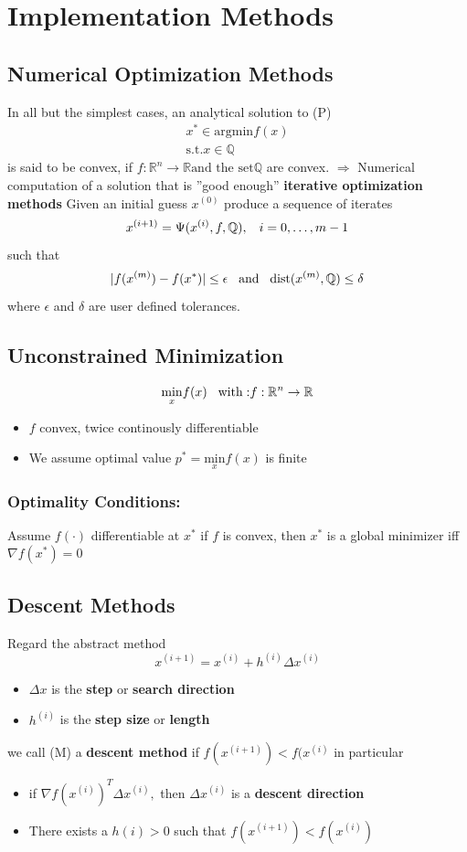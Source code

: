 \section{Implementation Methods}
\subsection{Numerical Optimization Methods}
In all but the simplest cases, an analytical solution to (P)
\begin{align*}
    x^*\in \mathrm{arg} \mathrm{min}f(x)\\
    \mathrm{s.t.} x\in\mathbb{Q}
\end{align*}
is said to be convex, if $f: \mathbb{R}^n\rightarrow\mathbb{R} \textrm{and the set} \mathbb{Q}$ are convex.
$\Rightarrow$ Numerical computation of a solution that is ''good enough''
\textbf{iterative optimization methods}
Given an initial guess $x^{(0)}$ produce a sequence of iterates \[x^{(i+1)} = \Psi(x^{(i)},f,\mathbb{Q}), \hspace{3mm} i=0,\dots,m-1\]
such that \[|f(x^{(m)})-f(x^*)| \leq\epsilon \hspace{3mm}\textrm{and}\hspace{3mm} \mathrm{dist}(x^{(m)},\mathbb{Q})\leq \delta\]
where $\epsilon$ and $\delta$ are user defined tolerances.
\subsection{Unconstrained Minimization} \[\underset{x}{\mathrm{min}}f(x) \hspace{3mm} \mathrm{with:} f:\mathbb{R}^n \rightarrow \mathbb{R}\] 
\begin{itemize}
    \item $f$ convex, twice continously differentiable
    \item We assume optimal value $p^* = \underset{x}{\mathrm{min}}f(x)$ is finite
\end{itemize}
\subsubsection{Optimality Conditions:}
Assume $f(\cdot)$ differentiable at $x^*$ if $f$ is convex, then $x^*$ is a global minimizer iff $\nabla f(x^*) = 0$
\subsection{Descent Methods}
Regard the abstract method \[x^{(i+1)} = x^{(i)} + h^{(i)} \Delta x^{(i)}\]
\begin{itemize}
    \item $\Delta x$ is the \textbf{step} or \textbf{search direction}
    \item $h^{(i)}$ is the \textbf{step size} or \textbf{length}
\end{itemize}
we call (M) a \textbf{descent method} if $f(x^{(i+1)}) < f(x^{(i)}$ in particular
\begin{itemize}
    \item if $\nabla f(x^{(i)})^T\Delta x^{(i)},$ then $\Delta x^{(i)}$ is a \textbf{descent direction}
    \item There exists a $h{(i)}> 0$ such that $f(x^{(i+1)}) < f(x^{(i)})$ 
\end{itemize}
